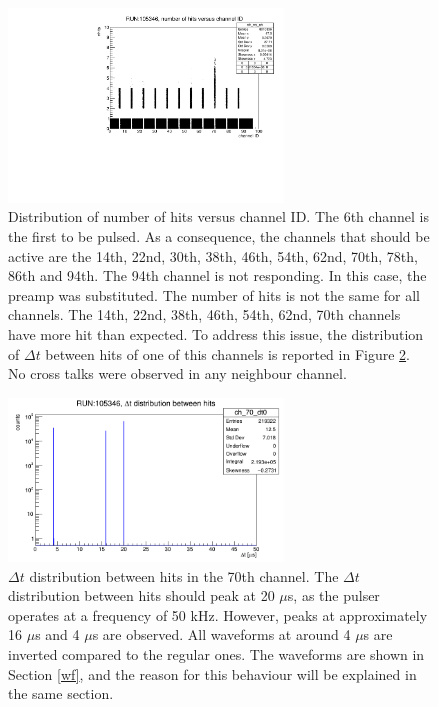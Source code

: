 \begin{figure}[!h]
  \centering
  \includegraphics[width=0.65\textwidth]{figures/pdf/run105346_nh_vs_ch.pdf}
  \caption{Distribution of number of hits versus channel ID. The 6th channel is the first to be pulsed.
  As a consequence, the channels that should be active are the 14th, 22nd, 30th, 38th, 46th, 54th, 62nd, 70th, 78th, 86th and 94th. 
  The 94th channel is not responding. In this case, the preamp was substituted.
  The number of hits is not the same for all channels. The 14th, 22nd, 38th, 46th, 54th, 62nd, 70th channels have more hit than expected.
  To address this issue, the distribution of $\Delta t$ between hits of one of this channels is reported in Figure \ref{fig:deltatnhits}.
  No cross talks were observed in any neighbour channel.}
 \label{fig:dead}
\end{figure}


\begin{figure}[!h]
  \centering
  \includegraphics[width=0.65\textwidth]{figures/png/deltathits.png}
  \caption{$\Delta t$ distribution between hits in the 70th channel. The $\Delta t$ distribution between hits 
  should peak at 20 $\mu$s, as the pulser operates at a frequency of 50 kHz. However, peaks at approximately 
  16 $\mu$s and 4 $\mu$s are observed. All waveforms at around 4 $\mu$s are inverted compared to the regular ones. 
  The waveforms are shown in Section \ref{wf}, and the reason for this behaviour will be explained in the same section.}
 \label{fig:deltatnhits}
\end{figure}

